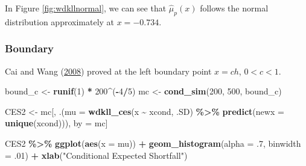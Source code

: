 \documentclass[
]{article}
\newenvironment{Shaded}{\begin{snugshade}}{\end{snugshade}}
\newcommand{\DataTypeTok}[1]{\textcolor[rgb]{0.13,0.29,0.53}{#1}}
\newcommand{\DecValTok}[1]{\textcolor[rgb]{0.00,0.00,0.81}{#1}}
\newcommand{\FloatTok}[1]{\textcolor[rgb]{0.00,0.00,0.81}{#1}}
\newcommand{\KeywordTok}[1]{\textcolor[rgb]{0.13,0.29,0.53}{\textbf{#1}}}
\newcommand{\NormalTok}[1]{#1}
\newcommand{\OperatorTok}[1]{\textcolor[rgb]{0.81,0.36,0.00}{\textbf{#1}}}
\newcommand{\StringTok}[1]{\textcolor[rgb]{0.31,0.60,0.02}{#1}}
\theoremstyle{definition}
\theoremstyle{definition}
\theoremstyle{definition}
\theoremstyle{remark}
\begin{document}
In Figure \ref{fig:wdkllnormal}, we can see that \(\hat\mu_p(x)\) follows the normal distribution approximately at \(x = -0.734\).

\hypertarget{boundary}{%
\subsubsection{Boundary}\label{boundary}}

Cai and Wang (\protect\hyperlink{ref-cai:2008aa}{2008}) proved at the left boundary point \(x = ch\), \(0 < c < 1\).

\begin{Shaded}
\begin{Highlighting}[]
\NormalTok{bound\_c <{-}}\StringTok{ }\KeywordTok{runif}\NormalTok{(}\DecValTok{1}\NormalTok{) }\OperatorTok{*}\StringTok{ }\DecValTok{200}\OperatorTok{\^{}}\NormalTok{(}\OperatorTok{{-}}\DecValTok{4}\OperatorTok{/}\DecValTok{5}\NormalTok{)}
\NormalTok{mc <{-}}\StringTok{ }\KeywordTok{cond\_sim}\NormalTok{(}\DecValTok{200}\NormalTok{, }\DecValTok{500}\NormalTok{, bound\_c)}
\end{Highlighting}
\end{Shaded}

\begin{Shaded}
\begin{Highlighting}[]
\NormalTok{CES2 <{-}}\StringTok{ }
\StringTok{  }\NormalTok{mc[,}
\NormalTok{     .(}\DataTypeTok{mu =}
         \KeywordTok{wdkll\_ces}\NormalTok{(x }\OperatorTok{\textasciitilde{}}\StringTok{ }\NormalTok{xcond, .SD) }\OperatorTok{\%>\%}\StringTok{ }
\StringTok{         }\KeywordTok{predict}\NormalTok{(}\DataTypeTok{newx =} \KeywordTok{unique}\NormalTok{(xcond))),}
\NormalTok{     by =}\StringTok{ }\NormalTok{mc]}
\end{Highlighting}
\end{Shaded}

\begin{Shaded}
\begin{Highlighting}[]
\NormalTok{CES2 }\OperatorTok{\%>\%}\StringTok{ }
\StringTok{  }\KeywordTok{ggplot}\NormalTok{(}\KeywordTok{aes}\NormalTok{(}\DataTypeTok{x =}\NormalTok{ mu)) }\OperatorTok{+}
\StringTok{  }\KeywordTok{geom\_histogram}\NormalTok{(}\DataTypeTok{alpha =} \FloatTok{.7}\NormalTok{, }\DataTypeTok{binwidth =} \FloatTok{.01}\NormalTok{) }\OperatorTok{+}
\StringTok{  }\KeywordTok{xlab}\NormalTok{(}\StringTok{"Conditional Expected Shortfall"}\NormalTok{)}
\end{Highlighting}
\end{Shaded}
\end{document}
